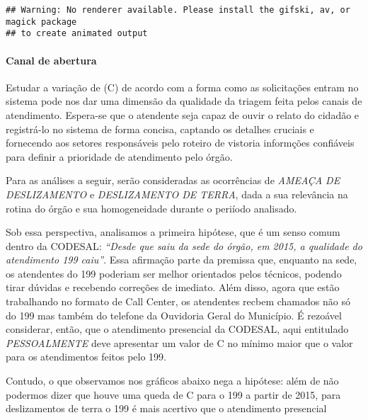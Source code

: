 \documentclass[
]{article}
\begin{document}
\begin{verbatim}
## Warning: No renderer available. Please install the gifski, av, or magick package
## to create animated output
\end{verbatim}

\hypertarget{canal-de-abertura}{%
\paragraph{Canal de abertura}\label{canal-de-abertura}}

Estudar a variação de (C) de acordo com a forma como as solicitações
entram no sistema pode nos dar uma dimensão da qualidade da triagem
feita pelos canais de atendimento. Espera-se que o atendente seja capaz
de ouvir o relato do cidadão e registrá-lo no sistema de forma concisa,
captando os detalhes cruciais e fornecendo aos setores responsáveis pelo
roteiro de vistoria informções confiáveis para definir a prioridade de
atendimento pelo órgão.

Para as análises a seguir, serão consideradas as ocorrências de
\emph{AMEAÇA DE DESLIZAMENTO} e \emph{DESLIZAMENTO DE TERRA}, dada a sua
relevância na rotina do órgão e sua homogeneidade durante o periíodo
analisado.

Sob essa perspectiva, analisamos a primeira hipótese, que é um senso
comum dentro da CODESAL: \emph{``Desde que saiu da sede do órgão, em
2015, a qualidade do atendimento 199 caiu''}. Essa afirmação parte da
premissa que, enquanto na sede, os atendentes do 199 poderiam ser melhor
orientados pelos técnicos, podendo tirar dúvidas e recebendo correções
de imediato. Além disso, agora que estão trabalhando no formato de Call
Center, os atendentes recbem chamados não só do 199 mas também do
telefone da Ouvidoria Geral do Município. É rezoável considerar, então,
que o atendimento presencial da CODESAL, aqui entitulado
\emph{PESSOALMENTE} deve apresentar um valor de C no mínimo maior que o
valor para os atendimentos feitos pelo 199.

Contudo, o que observamos nos gráficos abaixo nega a hipótese: além de
não podermos dizer que houve uma queda de C para o 199 a partir de 2015,
para deslizamentos de terra o 199 é mais acertivo que o atendimento
presencial
\end{document}

